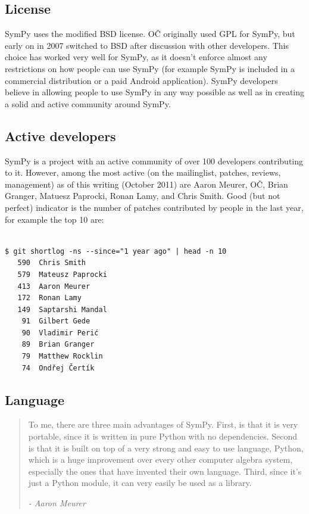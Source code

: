 \documentclass[12pt]{article}
\def\OC{OČ}
\begin{document}
\subsection{License}

SymPy uses the modified BSD license. \OC{} originally used GPL for SymPy, but
early on in 2007 switched to BSD after discussion with other developers. This
choice has worked very well for SymPy, as it doesn't enforce almost any
restrictions on how people can use SymPy (for example SymPy is included in
a commercial distribution or a paid Android application). SymPy developers
believe in allowing people to use SymPy in any way possible as well as in
creating a solid and active community around SymPy.

\subsection{Active developers}

SymPy is a project with an active community of
over 100 developers contributing to it. However, among the most active (on the
mailinglist, patches, reviews, management) as of this writing (October 2011)
are Aaron Meurer, \OC, Brian Granger, Matuesz Paprocki, Ronan Lamy, and Chris
Smith. Good (but not perfect) indicator is the number of patches contributed by
people in the last year, for example the top 10 are:

\begin{Verbatim}[fontsize=\scriptsize,fontfamily=courier,fontshape=tt,frame=single,label=git-log]

$ git shortlog -ns --since="1 year ago" | head -n 10
   590  Chris Smith
   579  Mateusz Paprocki
   413  Aaron Meurer
   172  Ronan Lamy
   149  Saptarshi Mandal
    91  Gilbert Gede
    90  Vladimir Perić
    89  Brian Granger
    79  Matthew Rocklin
    74  Ondřej Čertík
\end{Verbatim}


\subsection{Language}

\begin{quotation}
To me, there are three main
advantages of SymPy.  First, is that it is very portable,
since it is written in pure Python with no dependencies.
Second is that it is built on top of a very strong and easy to use
language, Python, which is a huge improvement over every other
computer algebra system, especially the ones that have invented their
own language.  Third, since it's just a Python module, it can very
easily be used as a library. 

{\em - Aaron Meurer}
\end{quotation}
\end{document}
